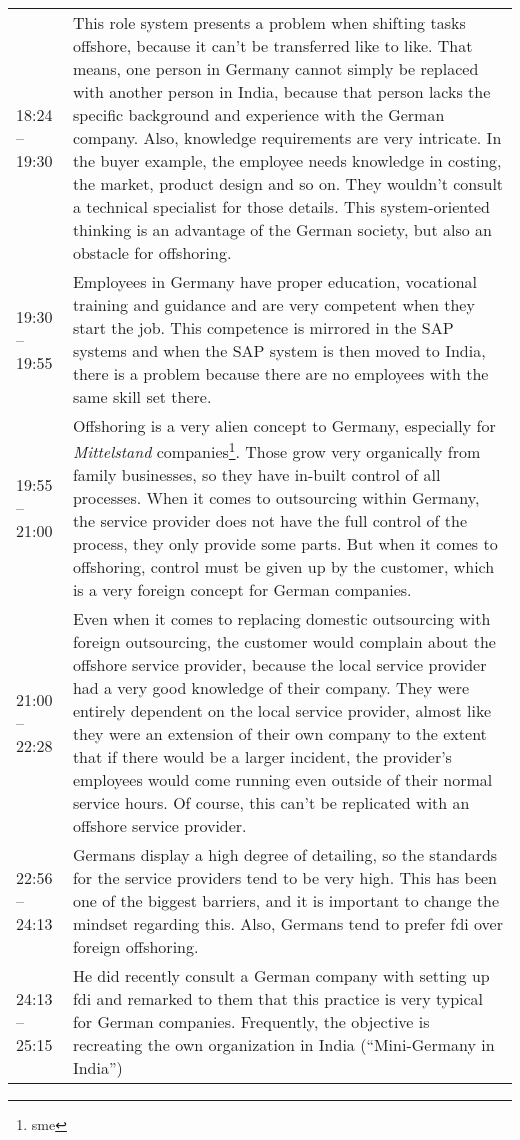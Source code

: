 \begin{appendix}
\begin{longtable}{l p{12.5cm}}
	18:24 -- 19:30& This role system presents a problem when shifting tasks offshore, because it can't be transferred like to like. That means, one person in Germany cannot simply be replaced with another person in India, because that person lacks the specific background and experience with the German company. Also, knowledge requirements are very intricate. In the buyer example, the employee needs knowledge in costing, the market, product design and so on. They wouldn't consult a technical specialist for those details. This system-oriented thinking is an advantage of the German society, but also an obstacle for offshoring.\\
	19:30 -- 19:55& Employees in Germany have proper education, vocational training and guidance and are very competent when they start the job. This competence is mirrored in the SAP systems and when the SAP system is then moved to India, there is a problem because there are no employees with the same skill set there.\\
	19:55 -- 21:00& Offshoring is a very alien concept to Germany, especially for \textit{Mittelstand} companies\footnote{\Acrlong{sme}}. Those grow very organically from family businesses, so they have in-built control of all processes. When it comes to outsourcing within Germany, the service provider does not have the full control of the process, they only provide some parts. But when it comes to offshoring, control must be given up by the customer, which is a very foreign concept for German companies.\\
	21:00 -- 22:28&Even when it comes to replacing domestic outsourcing with foreign outsourcing, the customer would complain about the offshore service provider, because the local service provider had a very good knowledge of their company. They were entirely dependent on the local service provider, almost like they were an extension of their own company to the extent that if there would be a larger incident, the provider's employees would come running even outside of their normal service hours. Of course, this can't be replicated with an offshore service provider.\\
	22:56 -- 24:13& Germans display a high degree of detailing, so the standards for the service providers tend to be very high. This has been one of the biggest barriers, and it is important to change the mindset regarding this. Also, Germans tend to prefer \gls{fdi} over foreign offshoring.\\
	24:13 -- 25:15& He did recently consult a German company with setting up \gls{fdi} and remarked to them that this practice is very typical for German companies. Frequently, the objective is recreating the own organization in India (``Mini-Germany in India'')\\

\end{longtable}
\end{appendix}
